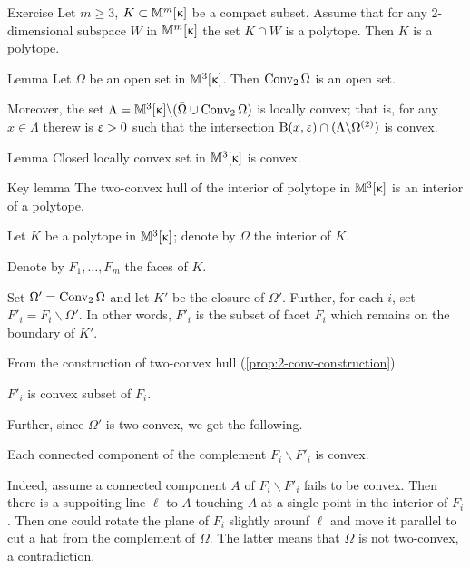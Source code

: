 \begin{thm}{Exercise}\label{ex:polygon-slices}
Let $m\ge 3$,
$K\subset \Lob{m}{\kappa}$ be a compact subset.
Assume that for any 2-dimensional subspace $W$ in $\mathbb{M}_{{}}^{m}[{\upkappa}]$
the set $K\cap W$ is a polytope. 
Then $K$ is a polytope.
\end{thm}

\begin{thm}{Lemma}\label{lem:loc-concave}
Let $\Omega$ be an open set in $\mathbb{M}_{{}}^{3}[{\upkappa}]$.
Then $\mathop{\rm Conv}\nolimits_2\Omega$ is an open set.
 
Moreover, the set $\Lambda=\Lob{3}{\kappa}\backslash(\bar\Omega\cup\Conv_2\Omega)$
 is locally convex;
that is, for any $x\in\Lambda$ therew is $\upvarepsilon>0$ such that the intersection
$\oBall(x,\eps)\cap(\Lambda\backslash\Omega^{(2)})$
is convex.
\end{thm}

\begin{thm}{Lemma}
Closed locally convex set in $\mathbb{M}_{{}}^{3}[{\upkappa}]$ is convex. 
\end{thm}




\begin{thm}{Key lemma}\label{lem:key-shefel}
The two-convex hull of the interior of polytope in $\mathbb{M}_{{}}^{3}[{\upkappa}]$
is an interior of a polytope.
\end{thm}

Let $K$ be a polytope in $\mathbb{M}_{{}}^{3}[{\upkappa}]$;
denote by $\Omega$ the interior of $K$.

Denote by $F_1,\dots,F_m$ the faces of $K$.

Set $\Omega'=\mathop{\rm Conv}\nolimits_2\Omega$ and let $K'$ be the closure of $\Omega'$.
Further, 
for each $i$, 
set $F'_i=F_i\backslash \Omega'$.
In other words, 
$F'_i$ is the subset of facet $F_i$ 
which remains on the boundary of $K'$.

From the construction of two-convex hull (\ref{prop:2-conv-construction})

\begin{clm}{}\label{clm:F'-convex}
$F'_i$ is convex subset of $F_i$.
\end{clm}

Further, since $\Omega'$ is two-convex,
we get the following.

\begin{clm}{}\label{clm:complement-of-F'-convex}
Each connected component of the complement $F_i\backslash F'_i$ is convex.
\end{clm}

Indeed, assume a connected component $A$ of $F_i\backslash F'_i$ fails to be convex.
Then there is a suppoiting line $\ell$ to $A$ touching $A$ at a single point in the interior of $F_i$.
Then one could rotate the plane of $F_i$ slightly arounf $\ell$ and move it parallel to cut a hat from the complement of $\Omega$.
The latter means that $\Omega$ is not two-convex, 
a contradiction.
\claimqeds

